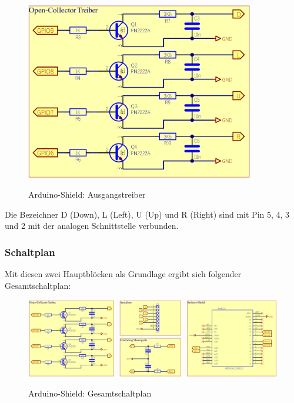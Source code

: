 \begin{figure}[H]
	\centering
	\includegraphics[width=10cm]{../ref/SchematicAusgangstreiberGS232.png}
	\label{fig:Schaltung_Ausgangstreiber_Arduino-Shield}
	\caption{Arduino-Shield: Ausgangstreiber}
\end{figure}

Die Bezeichner D (Down), L (Left), U (Up) und R (Right) sind mit Pin 5, 4, 3 und 2 mit der analogen Schnittstelle verbunden.

\subsubsection{Schaltplan}
Mit diesen zwei Hauptblöcken als Grundlage ergibt sich folgender Gesamtschaltplan:
\begin{figure}[H]
	\centering
	\includegraphics[width=\linewidth]{../ref/SchematicFullGS232.png}
	\label{fig:Schaltung__Arduino-Shield}
	\caption{Arduino-Shield: Gesamtschaltplan}
\end{figure}

